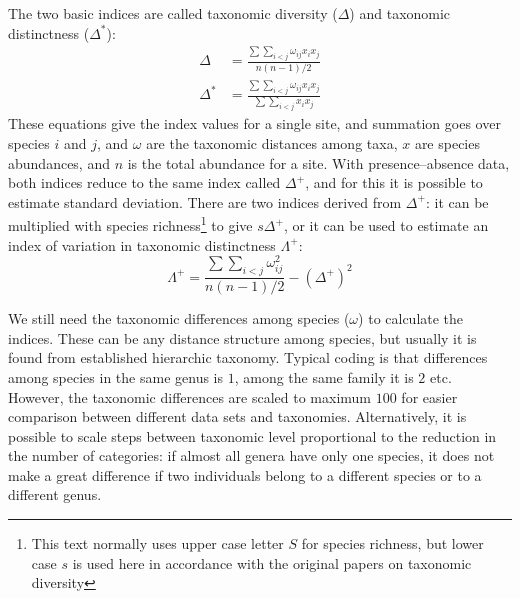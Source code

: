\documentclass[article,nojss]{jss}
\begin{document}
The two basic indices are called taxonomic diversity ($\Delta$) and
taxonomic distinctness ($\Delta^*$):
\begin{align}
  \Delta &= \frac{\sum \sum_{i<j} \omega_{ij} x_i x_j}{n (n-1) / 2}\\
\Delta^* &= \frac{\sum \sum_{i<j} \omega_{ij} x_i x_j}{\sum \sum_{i<j} x_i x_j}
\end{align}
These equations give the index values for a single site, and summation
goes over species $i$ and $j$, and $\omega$ are the taxonomic
distances among taxa, $x$ are species abundances, and $n$ is the total
abundance for a site.  With presence--absence data, both indices
reduce to the same index called $\Delta^+$, and for this it is
possible to estimate standard deviation. There are two indices
derived from $\Delta^+$: it can be multiplied with species
richness\footnote{This text normally uses upper case letter $S$ for
  species richness, but lower case $s$ is used here in accordance with
  the original papers on taxonomic diversity}
to give $s \Delta^+$, or it can be used to estimate an index of
variation in taxonomic distinctness $\Lambda^+$:
\begin{equation}
  \Lambda^+ = \frac{\sum \sum_{i<j} \omega_{ij}^2}{n (n-1) / 2} - (\Delta^+)^2
\end{equation}

We still need the taxonomic differences among species ($\omega$) to
calculate the indices. These can be any
distance structure among species, but usually it is found from
established hierarchic taxonomy. Typical coding is that differences
among species in the same genus is $1$, among the same family it is
$2$ etc. However, the taxonomic differences are scaled to maximum
$100$ for easier comparison between different data sets and
taxonomies. Alternatively, it is possible to scale steps between
taxonomic level proportional to the reduction in the number of
categories: if almost all genera have only one species, it does not
make a great difference if two individuals belong to a different
species or to a different genus.
\end{document}
